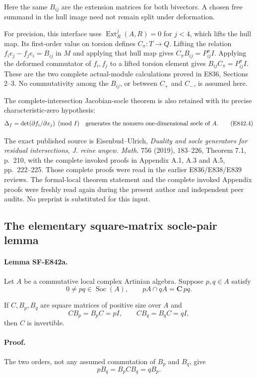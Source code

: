 Here the same \(B_{ij}\) are the extension matrices for both bivectors.
A chosen free summand in the hull image need not remain split under
deformation.

For precision, this interface uses
\(\operatorname{Ext}_R^j(A,R)=0\) for \(j<4\), which lifts the hull map.
Its first-order value on torsion defines \(C_\pi:T\to Q\).
Lifting the relation \(f_i e_j-f_j e_i=B_{ij}\) in \(M\) and applying that
hull map gives \(C_\pi B_{ij}=P^\pi_{ij}I\).
Applying the deformed commutator of \(f_i,f_j\) to a lifted torsion element
gives \(B_{ij}C_\pi=P^\pi_{ij}I\). These are the two complete actual-module
calculations proved in E836, Sections 2--3. No commutativity among the
\(B_{ij}\), or between \(C_+\) and \(C_-\), is assumed here.

The complete-intersection Jacobian-socle theorem is also retained with its
precise characteristic-zero hypothesis:
\[
 \Delta_f=\det(\partial f_i/\partial x_j)\pmod I
       \quad\hbox{generates the nonzero one-dimensional socle of }A.
 \tag{E842.4}
\]

The exact published source is Eisenbud--Ulrich, \emph{Duality and socle
generators for residual intersections}, \emph{J. reine angew. Math.}
756 (2019), 183--226, Theorem 7.1, p.~210, with the complete invoked proofs
in Appendix A.1, A.3 and A.5, pp.~222--225.\cite{SFEisenbudUlrich2019}
Those complete proofs were read in the earlier E836/E838/E839 reviews.
The formal-local theorem statement and the complete invoked Appendix proofs
were freshly read again during the present author and independent peer
audits. No preprint is substituted for this input.

\subsection{The elementary square-matrix socle-pair lemma}
\label{SF-E842:matrix}

\paragraph{Lemma SF-E842a.}
Let \(A\) be a commutative local complex Artinian algebra. Suppose
\(p,q\in A\) satisfy
\[
 0\ne pq\in\operatorname{Soc}(A),\qquad
                         pA\cap qA=\mathbf C\,pq.
 \tag{E842.5}
\]

If \(C,B_p,B_q\) are square matrices of positive size over \(A\) and
\[
 CB_p=B_pC=pI,\qquad CB_q=B_qC=qI,
 \tag{E842.6}
\]
then \(C\) is invertible.

\paragraph{Proof.}
The two orders, not any assumed commutation of \(B_p\) and \(B_q\), give
\[
 pB_q=B_pCB_q=qB_p.
 \tag{E842.7}
\]

